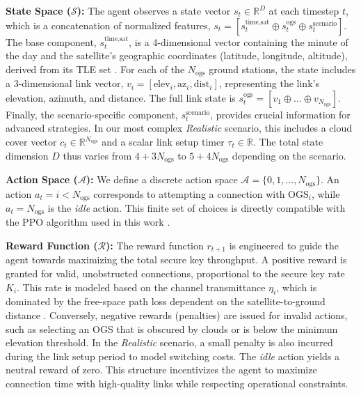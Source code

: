 \documentclass[manuscript, review, nonacm]{acmart}
\begin{document}
\textbf{State Space ($\mathcal{S}$):} The agent observes a state vector $s_t \in \mathbb{R}^D$ at each timestep $t$, which is a concatenation of normalized features, $s_t = [s_t^{\text{time,sat}} \oplus s_t^{\text{ogs}} \oplus s_t^{\text{scenario}}]$. The base component, $s_t^{\text{time,sat}}$, is a 4-dimensional vector containing the minute of the day and the satellite's geographic coordinates (latitude, longitude, altitude), derived from its TLE set \cite{vallado2001fundamentals}. For each of the $N_{\text{ogs}}$ ground stations, the state includes a 3-dimensional link vector, $v_i = [\text{elev}_i, \text{az}_i, \text{dist}_i]$, representing the link's elevation, azimuth, and distance. The full link state is $s_t^{\text{ogs}} = [v_1 \oplus \dots \oplus v_{N_{\text{ogs}}}]$. Finally, the scenario-specific component, $s_t^{\text{scenario}}$, provides crucial information for advanced strategies. In our most complex \textit{Realistic} scenario, this includes a cloud cover vector $c_t \in \mathbb{R}^{N_{\text{ogs}}}$ and a scalar link setup timer $\tau_t \in \mathbb{R}$. The total state dimension $D$ thus varies from $4+3N_{\text{ogs}}$ to $5+4N_{\text{ogs}}$ depending on the scenario.

\textbf{Action Space ($\mathcal{A}$):} We define a discrete action space $\mathcal{A} = \{0, 1, \dots, N_{\text{ogs}}\}$. An action $a_t = i < N_{\text{ogs}}$ corresponds to attempting a connection with $\text{OGS}_i$, while $a_t = N_{\text{ogs}}$ is the \textit{idle} action. This finite set of choices is directly compatible with the PPO algorithm used in this work \cite{schulman2017proximal}.

\textbf{Reward Function ($\mathcal{R}$):} The reward function $r_{t+1}$ is engineered to guide the agent towards maximizing the total secure key throughput. A positive reward is granted for valid, unobstructed connections, proportional to the secure key rate $K_i$. This rate is modeled based on the channel transmittance $\eta_i$, which is dominated by the free-space path loss dependent on the satellite-to-ground distance \cite{liao2017satellite, bourgoin2013comprehensive}. Conversely, negative rewards (penalties) are issued for invalid actions, such as selecting an OGS that is obscured by clouds or is below the minimum elevation threshold. In the \textit{Realistic} scenario, a small penalty is also incurred during the link setup period to model switching costs. The \textit{idle} action yields a neutral reward of zero. This structure incentivizes the agent to maximize connection time with high-quality links while respecting operational constraints.
\end{document}

